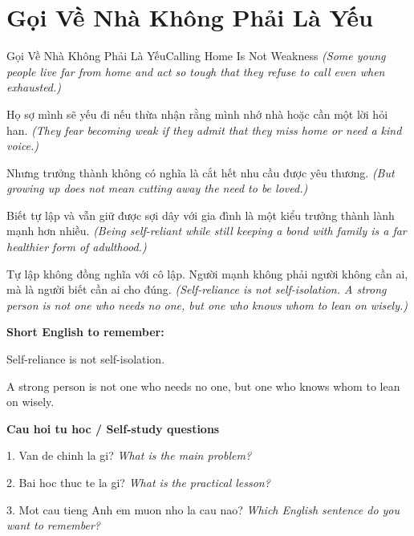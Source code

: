 \section{Gọi Về Nhà Không Phải Là Yếu}
\begin{truyen}{Gọi Về Nhà Không Phải Là Yếu}{Calling Home Is Not Weakness}
\textit{(Some young people live far from home and act so tough that they refuse to call even when exhausted.)}

Họ sợ mình sẽ yếu đi nếu thừa nhận rằng mình nhớ nhà hoặc cần một lời hỏi han.
\textit{(They fear becoming weak if they admit that they miss home or need a kind voice.)}

Nhưng trưởng thành không có nghĩa là cắt hết nhu cầu được yêu thương.
\textit{(But growing up does not mean cutting away the need to be loved.)}

Biết tự lập và vẫn giữ được sợi dây với gia đình là một kiểu trưởng thành lành mạnh hơn nhiều.
\textit{(Being self-reliant while still keeping a bond with family is a far healthier form of adulthood.)}

\end{truyen}

\begin{baihoc}
Tự lập không đồng nghĩa với cô lập. Người mạnh không phải người không cần ai, mà là người biết cần ai cho đúng.
\textit{(Self-reliance is not self-isolation. A strong person is not one who needs no one, but one who knows whom to lean on wisely.)}
\end{baihoc}

\begin{ghinhoanh}
\textbf{Short English to remember:}

Self-reliance is not self-isolation.

A strong person is not one who needs no one, but one who knows whom to lean on wisely.

\end{ghinhoanh}

\begin{tuhocnhanh}
\textbf{Cau hoi tu hoc / Self-study questions}

1. Van de chinh la gi? \textit{What is the main problem?}

2. Bai hoc thuc te la gi? \textit{What is the practical lesson?}

3. Mot cau tieng Anh em muon nho la cau nao? \textit{Which English sentence do you want to remember?}
\end{tuhocnhanh}
\ngancach

